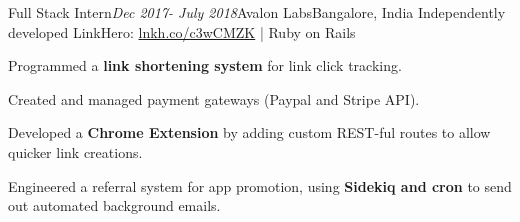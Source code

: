 \begin{rSubsection}{Full Stack Intern}{\em Dec 2017- July 2018}{Avalon Labs}{Bangalore, India}
    Independently developed LinkHero: \href{http://lnkh.co/c3wCMZK}{lnkh.co/c3wCMZK} | Ruby on Rails
    \item
    Programmed a \textbf{link shortening system} for link click tracking.
    \item 
    Created and managed payment gateways (Paypal and Stripe API).
    \item
    Developed a \textbf{Chrome Extension} by adding custom REST-ful routes to allow quicker link creations.
    \item Engineered a referral system for app promotion, using \textbf{Sidekiq and cron} to send out automated background emails.
\end{rSubsection}